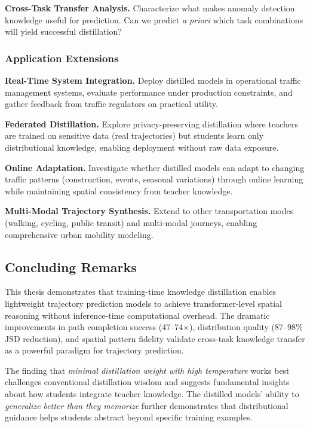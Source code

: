 \textbf{Cross-Task Transfer Analysis.} Characterize what makes anomaly detection knowledge useful for prediction. Can we predict \emph{a priori} which task combinations will yield successful distillation?

\subsubsection{Application Extensions}

\textbf{Real-Time System Integration.} Deploy distilled models in operational traffic management systems, evaluate performance under production constraints, and gather feedback from traffic regulators on practical utility.

\textbf{Federated Distillation.} Explore privacy-preserving distillation where teachers are trained on sensitive data (real trajectories) but students learn only distributional knowledge, enabling deployment without raw data exposure.

\textbf{Online Adaptation.} Investigate whether distilled models can adapt to changing traffic patterns (construction, events, seasonal variations) through online learning while maintaining spatial consistency from teacher knowledge.

\textbf{Multi-Modal Trajectory Synthesis.} Extend to other transportation modes (walking, cycling, public transit) and multi-modal journeys, enabling comprehensive urban mobility modeling.

\subsection{Concluding Remarks}
\label{sec:conclusion-remarks}

This thesis demonstrates that training-time knowledge distillation enables lightweight trajectory prediction models to achieve transformer-level spatial reasoning without inference-time computational overhead. The dramatic improvements in path completion success (47--74$\times$), distribution quality (87--98\% JSD reduction), and spatial pattern fidelity validate cross-task knowledge transfer as a powerful paradigm for trajectory prediction.

The finding that \emph{minimal distillation weight with high temperature} works best challenges conventional distillation wisdom and suggests fundamental insights about how students integrate teacher knowledge. The distilled models' ability to \emph{generalize better than they memorize} further demonstrates that distributional guidance helps students abstract beyond specific training examples.

